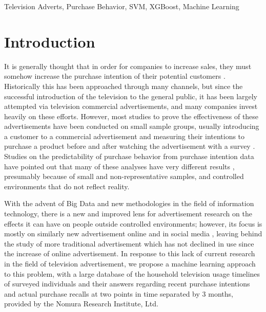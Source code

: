 \documentclass[review]{elsarticle}
\begin{document}
\begin{frontmatter}
\begin{abstract}
\end{abstract}

\begin{keyword}
Television Adverts\sep
Purchase Behavior\sep
SVM\sep
XGBoost\sep
Machine Learning
\end{keyword}

\end{frontmatter}

\linenumbers

\section{Introduction}
\label{intro}

It is generally thought that in order for companies to increase sales, they must somehow increase the purchase intention of their potential customers \cite[][]{armstrong,morwitz}. Historically this has been approached through many channels, but since the successful introduction of the television to the general public, it has been largely attempted via television commercial advertisements, and many companies invest heavily on these efforts. However, most studies to prove the effectiveness of these advertisements have been conducted on small sample groups, usually introducing a customer to a commercial advertisement and measuring their intentions to purchase a product before and after watching the advertisement with a survey \cite[e.g.][]{khuong}. Studies on the predictability of purchase behavior from purchase intention data have pointed out that many of these analyses have very different results \cite[][]{morwitz,sun,newberry}, presumably because of small and non-representative samples, and controlled environments that do not reflect reality. 

With the advent of Big Data and new methodologies in the field of information technology, there is a new and improved lens for advertisement research on the effects it can have on people outside controlled environments; however, its focus is mostly on similarly new advertisement online and in social media \cite[][]{shareef-ma,gonzalez,ramaboa,wu}, leaving behind the study of more traditional advertisement which has not declined in use since the increase of online advertisement. In response to this lack of current research in the field of television advertisement, we propose a machine learning approach to this problem, with a large database of the household television usage timelines of surveyed individuals and their answers regarding recent purchase intentions and actual purchase recalls at two points in time separated by 3 months, provided by the Nomura Research Institute, Ltd. 
\end{document}
